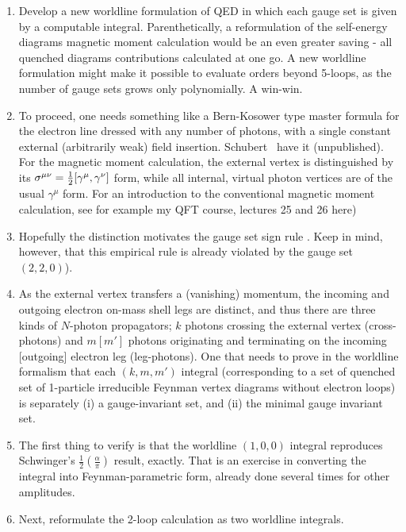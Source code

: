     \begin{enumerate}
  \item
Develop a new worldline formulation of QED in which each gauge set is
given by a computable integral. Parenthetically, a reformulation of the
self-energy diagrams magnetic moment calculation would be an even greater
saving - all quenched diagrams contributions calculated at one go. A new
worldline formulation might make it possible to evaluate orders beyond
5-loops, as the number of gauge sets grows only polynomially. A win-win.
  \item
To proceed, one needs something like a Bern-Kosower type
master formula for the electron line dressed with any number of photons,
with a single constant external (arbitrarily weak) field insertion.
Schubert \etal\ have it (unpublished). For
the magnetic moment calculation, the external vertex is distinguished by
its
\(
\sigma^{\mu\nu}={1\over 2}[\gamma^{\mu},\gamma^{\nu}]
\)
form, while all internal, virtual photon vertices are of the usual
$\gamma^{\mu}$ form. For an introduction to the conventional
magnetic moment calculation, see for example
my QFT course, lectures 25 and 26
{here})
  \item
Hopefully the distinction motivates the  gauge set sign rule
. Keep in mind, however, that this empirical rule is
already violated by the gauge set $(2,2,0)$).
  \item
As the external vertex transfers a (vanishing) momentum, the
incoming and outgoing electron on-mass shell legs are distinct, and thus
there are three kinds of $N$-photon propagators; $k$ photons crossing the
external vertex (cross-photons) and $m [m']$ photons originating and
terminating on the incoming [outgoing] electron leg (leg-photons). One
that needs to prove in the worldline formalism that each $(k,m,m')$
integral (corresponding to a set of quenched set of 1-particle
irreducible Feynman vertex diagrams without electron loops) is separately
(i) a gauge-invariant set, and
(ii) the minimal gauge invariant set.
  \item
The first thing to verify is that the worldline $(1,0,0)$ integral
reproduces Schwinger's $\frac{1}{2}\left(\frac{\alpha}{\pi}\right)$
result, exactly. That is an exercise in converting the
integral into Feynman-parametric form, already done several times for
other amplitudes.
  \item
Next, reformulate the 2-loop calculation as two worldline integrals.

\end{enumerate}
